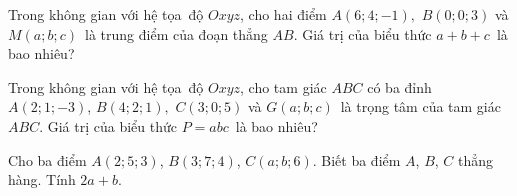 
\begin{bt}%
	Trong không gian với hệ tọa~độ $Oxyz$, cho  hai điểm $A(6; 4;-1),$ $ B(0; 0; 3)$ và $M(a; b; c)$~là trung điểm của đoạn thẳng $AB$. Giá trị của biểu thức $a+b+c$~là bao nhiêu?
\end{bt}

\begin{bt}%
	Trong không gian với hệ tọa~độ $Oxyz$, cho tam giác $ABC$ có ba  đỉnh $A(2; 1;-3)$, $B(4; 2; 1),$ $ C(3; 0; 5)$ và $G(a; b; c)$~là trọng tâm của tam giác $ABC$. Giá trị của biểu thức $P= abc$~là bao nhiêu?
\end{bt}

\begin{bt}%
	 Cho ba điểm $A(2; 5; 3)$, $B(3; 7; 4)$, $C(a; b; 6)$. Biết ba điểm $A$, $B$, $C$ thẳng hàng. Tính $2a+b$.
\end{bt}

